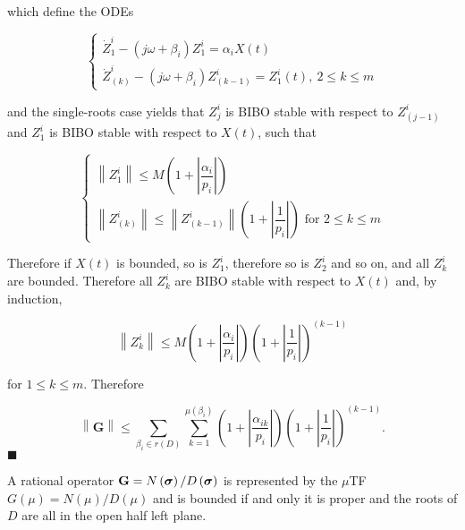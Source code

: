 	\noindent which define the ODEs

\begin{equation} \left\{\begin{array}{l}
	\dot{Z}_1^i - \left(j\omega + \beta_i\right)Z_1^i = \alpha_i X(t) \\[5mm]
	\dot{Z}_{(k)}^i - \left(j\omega + \beta_i\right)Z_{(k-1)}^i = Z_1^i(t),\ 2\leq k \leq m
\end{array}\right.
\end{equation}

	\noindent and the single-roots case yields that $Z_j^i$ is BIBO stable with respect to $Z_{(j-1)}^i$ and $Z_1^i$ is BIBO stable with respect to $X(t)$, such that

\begin{equation} \left\{\begin{array}{l}
	\left\lVert Z^i_1 \right\rVert \leq M \left( 1 + \left\lvert \dfrac{\alpha_i}{p_i}\right\rvert \right) \\[5mm] 
	\left\lVert Z^i_{(k)} \right\rVert \leq \left\lVert Z^i_{(k-1)} \right\rVert \left( 1 + \left\lvert \dfrac{1}{p_i}\right\rvert \right)\text{ for } 2 \leq k \leq m
\end{array}\right.
\end{equation}

	Therefore if $X(t)$ is bounded, so is $Z_1^i$, therefore so is $Z_2^i$ and so on, and all $Z_k^i$ are bounded. Therefore all $Z_k^i$ are BIBO stable with respect to $X(t)$ and, by induction,

\begin{equation} \left\lVert Z^i_k \right\rVert \leq M \left( 1 + \left\lvert \dfrac{\alpha_i}{p_i}\right\rvert \right)\left( 1 + \left\lvert \dfrac{1}{p_i}\right\rvert \right)^{(k-1)} \end{equation}

	for $1\leq k \leq m$. Therefore
	
\begin{equation} \left\lVert \mathbf{G} \right\rVert \leq \sum\limits_{\beta_i\in r\left(D\right)} \sum\limits_{k=1}^{\mu\left(\beta_i\right)} \left( 1 + \left\lvert \dfrac{\alpha_{ik}}{p_i}\right\rvert \right)\left( 1 + \left\lvert \dfrac{1}{p_i}\right\rvert \right)^{(k-1)} .\end{equation}
\hfill$\blacksquare$

\begin{corollary} A rational operator $\mathbf{G} = N\left(\boldsymbol{\sigma}\right)/D\left(\boldsymbol{\sigma}\right)$ is represented by the $\mu$TF $G\left(\mu\right) = N\left(\mu\right)/D\left(\mu\right)$ and is bounded if and only it is proper and the roots of $D$ are all in the open half left plane. \end{corollary}

